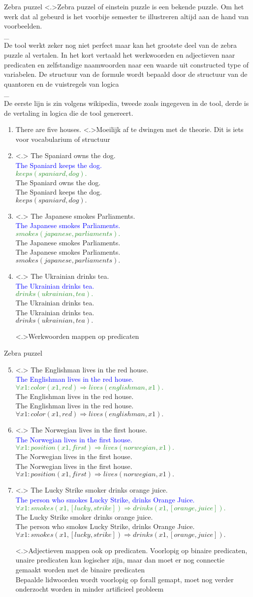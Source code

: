 \documentclass[notes, dvipsnames]{beamer}
\newcommand{\hitem}{
	\ppause
	\item
}
\newcommand{\ppause}{\onslide<+>}
\newcommand{\nnote}[1]{\note<.>{#1}}
\newcommand{\sentence}[3]{
  \alt<.>{
    #1 \\
    \textcolor{Blue}{#2} \\
    \textcolor{ForestGreen}{#3} \\
  }{
    #1 \\
    #2 \\
    #3 \\
  }
}
\begin{document}
  \begin{frame}{Zebra puzzel\cite{ZebraPuzzle}}
    \ppause
    \nnote{Zebra puzzel of einstein puzzle is een bekende puzzle. Om het werk dat al gebeurd is het voorbije semester te illustreren altijd aan de hand van voorbeelden.
    \\ _
    \\ De tool werkt zeker nog niet perfect maar kan het grootste deel van de zebra puzzle al vertalen. In het kort vertaald het werkwoorden en adjectieven naar predicaten en zelfstandige naamwoorden naar een waarde uit constructed type of variabelen. De structuur van de formule wordt bepaald door de structuur van de quantoren en de vuistregels van logica
    \\ _
    \\ De eerste lijn is zin volgens wikipedia, tweede zoals ingegeven in de tool, derde is de vertaling in logica die de tool genereert. \\
    }
    \begin{enumerate}
      \hitem There are five houses.
      \nnote{Moeilijk af te dwingen met de theorie. Dit is iets voor vocabularium of structuur}

      \hitem \sentence{The Spaniard owns the dog.}{The Spaniard keeps the dog.}{$keeps(spaniard,dog).$}
      \item \sentence{The Japanese smokes Parliaments.}{The Japanese smokes Parliaments.}{$smokes(japanese,parliaments).$}
      \item \sentence{The Ukrainian drinks tea.}{The Ukrainian drinks tea.}{$drinks(ukrainian,tea).$}
      \nnote{Werkwoorden mappen op predicaten}
    \end{enumerate}
  \end{frame}
  \begin{frame}{Zebra puzzel\cite{ZebraPuzzle}}
    \begin{enumerate}
      \setcounter{enumi}{4}
      \hitem \sentence{The Englishman lives in the red house.}{The Englishman lives in the red house.}{$\forall x1: color(x1,red) \Rightarrow lives(englishman,x1).$}
      \item \sentence{The Norwegian lives in the first house.}{The Norwegian lives in the first house.}{$\forall x1: position(x1,first) \Rightarrow lives(norwegian,x1).$}
      \item \sentence{The Lucky Strike smoker drinks orange juice.}{The person who smokes Lucky Strike, drinks Orange Juice.}{$\forall x1: smokes(x1,[lucky,strike]) \Rightarrow drinks(x1,[orange,juice]).$}
      \nnote{Adjectieven mappen ook op predicaten. Voorlopig op binaire predicaten, unaire predicaten kan logischer zijn, maar dan moet er nog connectie gemaakt worden met de binaire predicaten
      \\ Bepaalde lidwoorden wordt voorlopig op forall gemapt, moet nog verder onderzocht worden in minder artificieel probleem}
    \end{enumerate}
  \end{frame}
\end{document}
